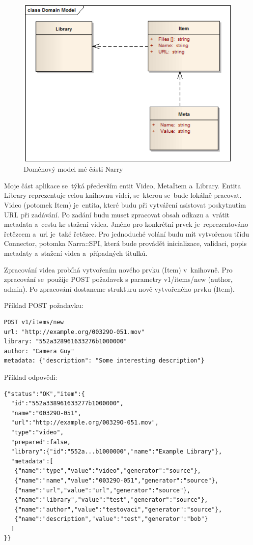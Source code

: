 \begin{figure}[H]
\includegraphics[width=1\textwidth]{./obrazova_priloha/domain_my.png}
\caption{Doménový model mé části Narry}
\end{figure}
\par Moje část aplikace se~týká především entit Video, MetaItem a~Library. Entita Library reprezentuje celou knihovnu videí, se~kterou se~bude lokálně pracovat. Video (potomek Item) je~entita, které budu při vytváření asistovat poskytnutím URL při zadávání. Po zadání budu muset zpracovat obsah odkazu a~vrátit metadata a~cestu ke stažení videa. Jméno pro konkrétní prvek je~reprezentováno řetězcem a~url je~také řetězec. Pro jednoduché volání budu mít vytvořenou třídu Connector, potomka Narra::SPI, která bude provádět inicializace, validaci, popis metadaty a~stažení videa a~případných titulků.
\par Zpracování videa probíhá vytvořením nového prvku (Item) v~knihovně. Pro zpracování se~použije POST požadavek s parametry v1/items/new (author, admin). Po zpracování dostaneme strukturu nově vytvořeného prvku (Item).
\par Příklad POST požadavku\cite{narra_en}:
\begin{verbatim} 
POST v1/items/new
url: "http://example.org/00329O-051.mov"
library: "552a328961633276b1000000" 
author: "Camera Guy"
metadata: {"description": "Some interesting description"}
\end{verbatim}
\hfill
\par Příklad odpovědi:
\begin{verbatim}
{"status":"OK","item":{
  "id":"552a338961633277b1000000",
  "name":"00329O-051",
  "url":"http://example.org/00329O-051.mov",
  "type":"video",
  "prepared":false,
  "library":{"id":"552a...b1000000","name":"Example Library"},
  "metadata":[
   {"name":"type","value":"video","generator":"source"},
   {"name":"name","value":"00329O-051","generator":"source"},
   {"name":"url","value":"url","generator":"source"},
   {"name":"library","value":"test","generator":"source"},
   {"name":"author","value":"testovaci","generator":"source"},
   {"name":"description","value":"test","generator":"bob"}
  ]
}}
\end{verbatim}
